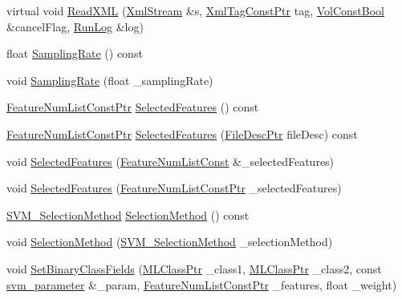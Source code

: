 \begin{DoxyCompactItemize}
\item 
virtual void \hyperlink{class_k_k_m_l_l_1_1_s_v_mparam_a2cd57741ec82e82e55a9a637ef14e7c0}{Read\+X\+ML} (\hyperlink{class_k_k_b_1_1_xml_stream}{Xml\+Stream} \&s, \hyperlink{namespace_k_k_b_a5f1b0b1667d79fec26deeff10c43df23}{Xml\+Tag\+Const\+Ptr} tag, \hyperlink{namespace_k_k_b_a7d390f568e2831fb76b86b56c87bf92f}{Vol\+Const\+Bool} \&cancel\+Flag, \hyperlink{class_k_k_b_1_1_run_log}{Run\+Log} \&log)
\item 
float \hyperlink{class_k_k_m_l_l_1_1_s_v_mparam_acfefd9e2a297952641d848e54f3932ca}{Sampling\+Rate} () const 
\item 
void \hyperlink{class_k_k_m_l_l_1_1_s_v_mparam_a48fffce9005030d7201d1429123929a4}{Sampling\+Rate} (float \+\_\+sampling\+Rate)
\item 
\hyperlink{namespace_k_k_m_l_l_a81284b0a14973267260023f9a72da94a}{Feature\+Num\+List\+Const\+Ptr} \hyperlink{class_k_k_m_l_l_1_1_s_v_mparam_a52c95a964ff1638bb24289967937b29b}{Selected\+Features} () const 
\item 
\hyperlink{namespace_k_k_m_l_l_a81284b0a14973267260023f9a72da94a}{Feature\+Num\+List\+Const\+Ptr} \hyperlink{class_k_k_m_l_l_1_1_s_v_mparam_a83040ef0a19057919d3701b3de6e6ba6}{Selected\+Features} (\hyperlink{namespace_k_k_m_l_l_aa0d0b6ab4ec18868a399b8455b05d914}{File\+Desc\+Ptr} file\+Desc) const 
\item 
void \hyperlink{class_k_k_m_l_l_1_1_s_v_mparam_a86c57234fe4588b42c62abff5db6f98a}{Selected\+Features} (\hyperlink{namespace_k_k_m_l_l_ad276a9ed309552a63300bce930bdfebd}{Feature\+Num\+List\+Const} \&\+\_\+selected\+Features)
\item 
void \hyperlink{class_k_k_m_l_l_1_1_s_v_mparam_a803c3e0c113be1980462e4a0ad438fc5}{Selected\+Features} (\hyperlink{namespace_k_k_m_l_l_a81284b0a14973267260023f9a72da94a}{Feature\+Num\+List\+Const\+Ptr} \+\_\+selected\+Features)
\item 
\hyperlink{namespace_k_k_m_l_l_afab7be632987641e5805e770be7f6bf8}{S\+V\+M\+\_\+\+Selection\+Method} \hyperlink{class_k_k_m_l_l_1_1_s_v_mparam_a084ed27759d9ef55a14b369da0ad7b93}{Selection\+Method} () const 
\item 
void \hyperlink{class_k_k_m_l_l_1_1_s_v_mparam_a9f86dd39fb9528dbed813bb1b0676b36}{Selection\+Method} (\hyperlink{namespace_k_k_m_l_l_afab7be632987641e5805e770be7f6bf8}{S\+V\+M\+\_\+\+Selection\+Method} \+\_\+selection\+Method)
\item 
void \hyperlink{class_k_k_m_l_l_1_1_s_v_mparam_aafd96edb5dd7c038e5d9bf49a1ba19f1}{Set\+Binary\+Class\+Fields} (\hyperlink{namespace_k_k_m_l_l_ac272393853d59e72e8456f14cd6d8c23}{M\+L\+Class\+Ptr} \+\_\+class1, \hyperlink{namespace_k_k_m_l_l_ac272393853d59e72e8456f14cd6d8c23}{M\+L\+Class\+Ptr} \+\_\+class2, const \hyperlink{struct_s_v_m233_1_1svm__parameter}{svm\+\_\+parameter} \&\+\_\+param, \hyperlink{namespace_k_k_m_l_l_a81284b0a14973267260023f9a72da94a}{Feature\+Num\+List\+Const\+Ptr} \+\_\+features, float \+\_\+weight)

\end{DoxyCompactItemize}
